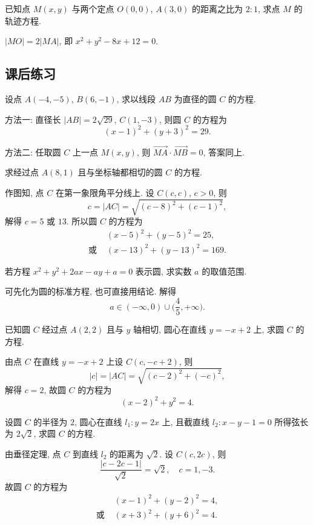 \begin{exercise}
    已知点 $M(x, y)$ 与两个定点 $O(0,0)$, $A(3,0)$ 的距离之比为 $2\colon 1$, 求点 $M$ 的轨迹方程.
\end{exercise}
\beginsolution
    $|MO|= 2|MA|$, 即 $x^2+y^2-8x+12= 0$.
\endsolution

\subsection{课后练习}
\begin{exercise}
    设点 $A(-4,-5)$, $B(6,-1)$, 求以线段 $AB$ 为直径的圆 $C$ 的方程.
\end{exercise}
\beginsolution
    方法一: 直径长 $|AB|= 2\sqrt{29}$, $C(1,-3)$, 则圆 $C$ 的方程为
    \[(x-1)^2+ (y+3)^2= 29.\]

    方法二: 任取圆 $C$ 上一点 $M(x,y)$, 则 $\overrightarrow{MA}\cdot \overrightarrow{MB}= 0$, 答案同上.
\endsolution

\begin{exercise}
    求经过点 $A(8, 1)$ 且与坐标轴都相切的圆 $C$ 的方程.
\end{exercise}
\beginsolution
    作图知, 点 $C$ 在第一象限角平分线上. 设 $C(c,c)$, $c>0$, 则
    \[c=|AC|= \sqrt{(c-8)^2+ (c-1)^2},\]
    解得 $c=5$ 或 $13$. 所以圆 $C$ 的方程为
    \[\begin{aligned}
        &(x-5)^2+ (y-5)^2= 25,\\
        \text{或\ }&(x-13)^2+ (y-13)^2= 169.
    \end{aligned}\]
\endsolution

\begin{exercise}
    若方程 $x^2 +y^2 +2ax-ay+a=0$ 表示圆, 求实数 $a$ 的取值范围.
\end{exercise}
\beginsolution
    可先化为圆的标准方程, 也可直接用结论. 解得
    \[a\in (-\infty,0)\cup \biggl(\frac45,+\infty\biggr).\]
\endsolution

\begin{exercise}
    已知圆 $C$ 经过点 $A(2,2)$ 且与 $y$ 轴相切, 圆心在直线 $y= -x+2$ 上, 求圆 $C$ 的方程.
\end{exercise}
\beginsolution
    由点 $C$ 在直线 $y= -x+2$ 上设 $C(c,-c+2)$, 则
    \[|c|= |AC|= \sqrt{(c-2)^2+(-c)^2},\]
    解得 $c=2$, 故圆 $C$ 的方程为
    \[(x-2)^2+ y^2=4.\]
\endsolution

\begin{exercise}
    设圆 $C$ 的半径为 $2$, 圆心在直线 $l_1\colon y=2x$ 上, 且截直线 $l_2\colon x-y-1=0$ 所得弦长为 $2\sqrt2$, 求圆 $C$ 的方程.
\end{exercise}
\beginsolution
    由垂径定理, 点 $C$ 到直线 $l_2$ 的距离为 $\sqrt2$. 设 $C(c,2c)$, 则
    \[\frac{|c- 2c- 1|}{\sqrt2}= \sqrt2,\quad c=1,-3.\]
    故圆 $C$ 的方程为
    \[\begin{aligned}
        &(x-1)^2+ (y-2)^2= 4,\\
        \text{或\ }&(x+3)^2+ (y+6)^2= 4.
    \end{aligned}\]
\endsolution

